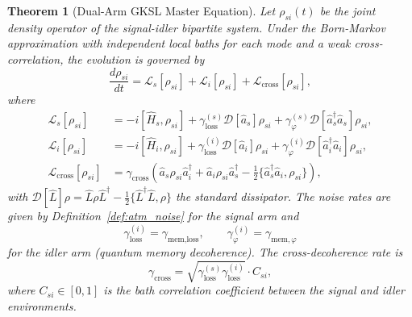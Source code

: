 \documentclass[journal]{IEEEtran}
\newtheorem{theorem}{Theorem}
\begin{document}
\begin{theorem}[Dual-Arm GKSL Master Equation]\label{thm:dual_gksl}
Let $\rho_{si}(t)$ be the joint density operator of the signal-idler bipartite system. Under the Born-Markov approximation with independent local baths for each mode and a weak cross-correlation, the evolution is governed by
\begin{equation}\label{eq:dual_gksl}
\frac{d\rho_{si}}{dt} = \mathcal{L}_s[\rho_{si}] + \mathcal{L}_i[\rho_{si}] + \mathcal{L}_{\text{cross}}[\rho_{si}],
\end{equation}
where
\begin{align}
\mathcal{L}_s[\rho_{si}] &= -i[\hat{H}_s, \rho_{si}] + \gamma_{\text{loss}}^{(s)}\mathcal{D}[\hat{a}_s]\rho_{si} + \gamma_{\varphi}^{(s)}\mathcal{D}[\hat{a}_s^\dagger\hat{a}_s]\rho_{si}, \label{eq:signal_liouvillian}\\
\mathcal{L}_i[\rho_{si}] &= -i[\hat{H}_i, \rho_{si}] + \gamma_{\text{loss}}^{(i)}\mathcal{D}[\hat{a}_i]\rho_{si} + \gamma_{\varphi}^{(i)}\mathcal{D}[\hat{a}_i^\dagger\hat{a}_i]\rho_{si}, \label{eq:idler_liouvillian}\\
\mathcal{L}_{\text{cross}}[\rho_{si}] &= \gamma_{\text{cross}}\left(\hat{a}_s\rho_{si}\hat{a}_i^\dagger + \hat{a}_i\rho_{si}\hat{a}_s^\dagger - \frac{1}{2}\{\hat{a}_s^\dagger\hat{a}_i, \rho_{si}\}\right), \label{eq:cross_liouvillian}
\end{align}
with $\mathcal{D}[\hat{L}]\rho = \hat{L}\rho\hat{L}^\dagger - \frac{1}{2}\{\hat{L}^\dagger\hat{L}, \rho\}$ the standard dissipator. The noise rates are given by Definition~\ref{def:atm_noise} for the signal arm and
\begin{equation}\label{eq:idler_noise_rates}
\gamma_{\text{loss}}^{(i)} = \gamma_{\text{mem,loss}}, \qquad \gamma_{\varphi}^{(i)} = \gamma_{\text{mem},\varphi}
\end{equation}
for the idler arm (quantum memory decoherence). The cross-decoherence rate is
\begin{equation}\label{eq:cross_rate}
\gamma_{\text{cross}} = \sqrt{\gamma_{\text{loss}}^{(s)} \gamma_{\text{loss}}^{(i)}} \cdot C_{si},
\end{equation}
where $C_{si} \in [0,1]$ is the bath correlation coefficient between the signal and idler environments.
\end{theorem}
\end{document}
